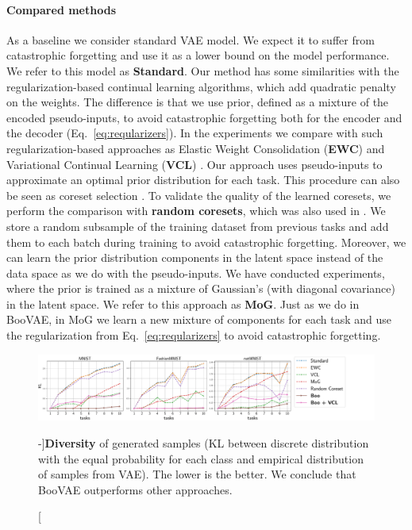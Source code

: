 \paragraph{Compared methods} As a baseline we consider standard VAE model. We expect it to suffer from catastrophic forgetting and use it as a lower bound on the model performance. We refer to this model as \textbf{Standard}.
Our method has some similarities with the regularization-based continual learning algorithms, which add quadratic penalty on the weights. The difference is that we use prior, defined as a mixture of the encoded pseudo-inputs, to avoid catastrophic forgetting both for the encoder and the decoder (Eq.~\ref{eq:reqularizers}). In the experiments we compare with such regularization-based approaches as Elastic Weight Consolidation (\textbf{EWC}) \citep{kirkpatrick2017overcoming} and Variational Continual Learning (\textbf{VCL}) \citep{nguyen2017variational}. 
Our approach uses pseudo-inputs to approximate an optimal prior distribution for each task. This procedure can also be seen as coreset selection \citep{huggins2016coresets, bachem2015coresets}. To validate the quality of the learned coresets, we perform the comparison with \textbf{random coresets}, which was also used in \citep{nguyen2017variational}. We store a random subsample of the training dataset from previous tasks and add them to each batch during training to avoid catastrophic forgetting. 
Moreover, we can learn the prior distribution components in the latent space instead of the data space as we do with the pseudo-inputs. We have conducted experiments, where the prior is trained as a mixture of Gaussian's (with diagonal covariance) in the latent space. We refer to this approach as \textbf{MoG}. Just as we do in BooVAE, in MoG we learn a new mixture of components for each task and use the regularization from Eq.~\ref{eq:reqularizers} to avoid catastrophic forgetting. 
\begin{figure}[t]{}
	\centering
		\includegraphics[width=1.1\textwidth]{pics/1_boovae/kl_mnists.pdf}
	\caption[][-\baselineskip]{\textbf{Diversity} of generated samples (KL between discrete distribution with the equal probability for each class and empirical distribution of samples from VAE). The lower is the better. We conclude that BooVAE outperforms other approaches.}\label{fig:online:diversity}
	     \vspace*{1.2\baselineskip}
 \end{figure}
 
